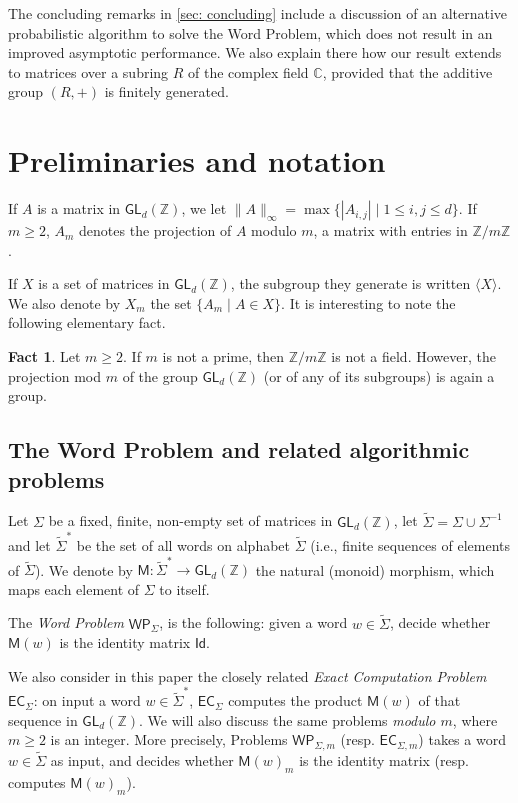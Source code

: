 \documentclass{article}
\def\alph{\tilde{\Sigma}}
\def\Id{\textsf{Id}}
\def\C{\mathbb{C}}
\def\Z{\mathbb{Z}}
\def\GL{\textsf{GL}}
\def\EC{\textsf{EC}}
\def\WP{\textsf{WP}}
\def\mat{\textsf{M}}
\theoremstyle{plain}
\theoremstyle{definition}
\newtheorem{fact}[theorem]{Fact}
\begin{document}
The concluding remarks in \cref{sec: concluding} include a discussion of an alternative probabilistic algorithm to solve the Word Problem, which does not result in an improved asymptotic performance. We also explain there how our result extends to matrices over a subring $R$ of the complex field $\C$, provided that the additive group $(R,+)$ is finitely generated.


\section{Preliminaries and notation}\label{sec: preliminaries}

If $A$ is a matrix in $\GL_d(\Z)$, we let $\|A\|_\infty = \max\{|A_{i,j}| \mid 1\le i,j\le d\}$. If $m\ge 2$, $A_m$ denotes the projection of $A$ modulo $m$, a matrix with entries in $\Z/m\Z$.

If $X$ is a set of matrices in $\GL_d(\Z)$, the subgroup they generate is written $\langle X\rangle$. We also denote by $X_m$ the set $\{A_m \mid A\in X\}$.
%
It is interesting to note the following elementary fact.

\begin{fact}\label{rk: mod m, gl(Z) is a group}
    Let $m\ge 2$. If $m$ is not a prime, then $\Z/m\Z$ is not a field. However, the projection mod $m$ of the group $\GL_d(\Z)$ (or of any of its subgroups) is again a group.
\end{fact}



\subsection{The Word Problem and related algorithmic problems}\label{sec: WP and related pbms}

Let $\Sigma$ be a fixed, finite, non-empty set of matrices in $\GL_d(\Z)$, let $\alph = \Sigma \cup \Sigma^{-1}$ and let $\alph^*$ be the set of all words on alphabet $\alph$ (i.e., finite sequences of elements of $\alph$). We denote by $\mat\colon \alph^* \to \GL_d(\Z)$ the natural (monoid) morphism, which maps each element of $\Sigma$ to itself.

The \emph{Word Problem} $\WP_\Sigma$, is the following: given a word $w \in \alph$, decide whether $\mat(w)$ is the identity matrix $\Id$.

We also consider in this paper the closely related \emph{Exact Computation Problem} $\EC_\Sigma$: on input a word $w\in \alph^*$, $\EC_\Sigma$ computes the product $\mat(w)$ of that sequence in $\GL_d(\Z)$.
%
We will also discuss the same problems \emph{modulo $m$}, where $m\ge 2$ is an integer. More precisely, Problems $\WP_{\Sigma,m}$ (resp. $\EC_{\Sigma,m}$) takes a word $w\in  \alph$ as input, and decides whether $\mat(w)_m$ is the identity matrix (resp. computes $\mat(w)_m$).
\end{document}
